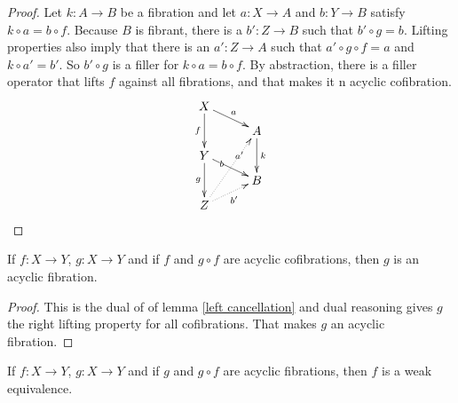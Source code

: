 \documentclass{tac}
\newcommand\hide[1]{}
\newcommand\of{:}
\newcommand\simplex\Delta
\newcommand\cycle{\partial\Delta}
\begin{document}
\begin{proof} Let $k\of A\to B$ be a fibration and let $a\of X\to A$ and $b\of Y\to B$ satisfy $k\circ a=b\circ f$. Because $B$ is fibrant, there is a $b'\of Z\to B$ such that $b'\circ g = b$. Lifting properties also imply that there is an $a'\of Z\to A$ such that $a'\circ g\circ f = a$ and $k\circ a'= b'$. So $b'\circ g$ is a filler for $k\circ a=b\circ f$. By abstraction, there is a filler operator that lifts $f$ against all fibrations, and that makes it n acyclic cofibration.
\[\xy
(0,28)*+{X}="x",(14\halfrootthree,21)*+{A}="a",(0,14)*+{Y}="y",(14\halfrootthree,7)*+{B}="b",(0,0)*+{Z}="z"
\ar^a "x";"a" \ar_f "x";"y" \ar^k "a";"b" \ar|(.33)b "y";"b" \ar_g "y";"z"
\ar@{.>}_{b'} "z";"b" \ar@{.>}|(.67){a'} "z";"a"
\endxy\]
\end{proof}

\begin{lemma} If $f\of X\to Y$, $g\of X\to Y$ and if $f$ and $g\circ f$ are acyclic cofibrations, then $g$ is an acyclic fibration. \label{right cancellation}\end{lemma}

\begin{proof} This is the dual of of lemma \ref{left cancellation} and dual reasoning gives $g$ the right lifting property for all cofibrations. That makes $g$ an acyclic fibration. \hide{Next assume that $f$ and $g\circ f$ are acyclic fibrations. Let $k\of\cycle[n]\to\simplex[n]$ be the cycle inclusion. Let $a\of\cycle[n]\to Y$ and $b\of\simplex[n]\to Y$ satisfy $b\circ k = g \circ a$. Because $\cycle[n]$ is cofibrant, there is an $a'\of \cycle[n]\to X$ such that $f\circ a' = a$ and hence $(g\circ f)\circ a' = b\circ c$. There is a filler $b'\of\simplex[n]\to X$ for this commutative square. The morphism $f\circ b'$ is a filler for the square $b\circ k = g \circ a$. This proves $g$ is an acyclic fibration.

\[\xy
(14\halfrootthree,28)*+{X}="x", (0,21)*+{\cycle[n]}="v", (14\halfrootthree,14)*+{Y}="y", (0,7)*+{\simplex[n]}="w", (14\halfrootthree,0)*+{Z}="z"
\ar@{.>}^{a'} "v";"x" \ar|(.67)a "v";"y" \ar_k "v";"w"
\ar@{.>}|(.33){b'} "w";"x" \ar_b "w";"z"
\ar "x";"y" \ar "y";"z"
\endxy\]}
\end{proof}

\begin{lemma} If $f\of X\to Y$, $g\of X\to Y$ and if $g$ and $g\circ f$ are acyclic fibrations, then $f$ is a weak equivalence.\label{shared retract 2} \end{lemma}
\end{document}
